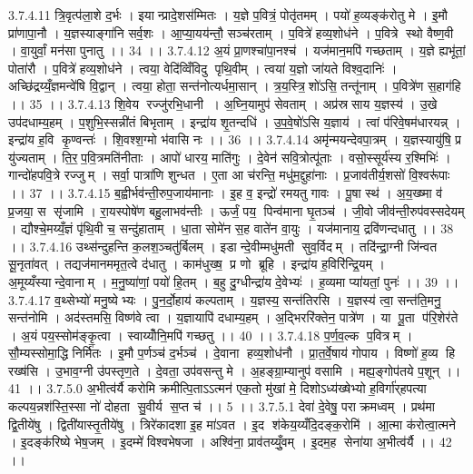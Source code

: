 3.7.4.11
त्रि॒वृत्प॑ला॒शे द॒र्भः । इयान्प्रादे॒शस॑म्मितः । य॒ज्ञे प॒वित्रं॒ पोतृ॑तमम् । पयो॑ ह॒व्यङ्क॑रोतु मे । इ॒मौ प्रा॑णापा॒नौ । य॒ज्ञस्याङ्गा॑नि सर्व॒शः । आ॒प्या॒यय॑न्तौ॒ सञ्च॑रताम् । प॒वित्रे॑ हव्य॒शोध॑ने । प॒वित्रे स्थो वैष्ण॒वी । वा॒युर्वां॒ मन॑सा पुनातु ।। 34 ।।
3.7.4.12
अ॒यं प्रा॒णश्चा॑पा॒नश्च॑ । यज॑मान॒मपि॑ गच्छताम् । य॒ज्ञे ह्यभू॑तां॒ पोता॑रौ । प॒वित्रे॑ हव्य॒शोध॑ने । त्वया॒ वेदि॑व्विँविदु पृथि॒वीम् । त्वया॑ य॒ज्ञो जा॑यते विश्व॒दानिः॑ । अच्छि॑द्रय्यँ॒ज्ञमन्वे॑षि वि॒द्वान् । त्वया॒ होता॒ सन्त॑नोत्यर्धमा॒सान् । त्र॒य॒स्त्रि॒॒शो॑ऽसि॒ तन्तू॑नाम् । प॒वित्रे॑ण स॒हाग॑हि ।। 35 ।।
3.7.4.13
शि॒वेय रज्जु॑रभि॒धानी । अ॒घ्नि॒यामुप॑ सेवताम् । अप्र॑स्रसाय य॒ज्ञस्य॑ । उ॒खे उप॑दधाम्य॒हम् । प॒शुभि॒स्सन्नी॑तं बिभृताम् । इन्द्रा॑य शृ॒तन्दधि॑ । उ॒प॒वे॒षो॑ऽसि य॒ज्ञाय॑ । त्वां प॑रिवे॒षम॑धारयन्न् । इन्द्रा॑य ह॒वि कृ॒ण्वन्तः॑ । शि॒वश्श॒ग्मो भ॑वासि नः ।। 36 ।।
3.7.4.14
अमृ॑न्मयन्देवपा॒त्रम् । य॒ज्ञस्यायु॑षि॒ प्र यु॑ज्यताम् । ति॒र॒प॒वि॒त्रमति॑नीताः । आपो॑ धारय॒ माति॑गुः । दे॒वेन॑ सवि॒त्रोत्पू॑ताः । वसो॒स्सूर्य॑स्य र॒श्मिभिः॑ । गान्दो॑हपवि॒त्रे रज्जुम् । सर्वा॒ पात्रा॑णि शुन्धत । ए॒ता आ च॑रन्ति॒ मधु॑म॒द्दुहा॑नाः । प्र॒जाव॑तीर्य॒शसो॑ वि॒श्वरू॑पाः ।। 37 ।।
3.7.4.15
ब॒ह्वीर्भव॑न्ती॒रुप॒जाय॑मानाः । इ॒ह व॒ इन्द्रो॑ रमयतु गावः । पू॒षा स्थ॑ । अ॒य॒ख्ष्मा व॑ प्र॒जया॒ स सृ॑जामि । रा॒यस्पोषे॑ण बहु॒लाभव॑न्तीः । ऊर्जं॒ पय॒ पिन्व॑माना घृ॒तञ्च॑ । जी॒वो जीव॑न्ती॒रुप॑वस्सदेयम् । द्यौश्चे॒मय्यँ॒ज्ञं पृ॑थि॒वी च॒ सन्दु॑हाताम् । धा॒ता सोमे॑न स॒ह वाते॑न वा॒युः । यज॑मानाय॒ द्रवि॑णन्दधातु ।। 38 ।।
3.7.4.16
उथ्स॑न्दुहन्ति क॒लश॒ञ्चतु॑र्बिलम् । इडान्दे॒वीम्मधु॑मती सुव॒र्विदम् । तदि॑न्द्रा॒ग्नी जि॑न्वत सू॒नृता॑वत् । तद्यज॑मानममृत॒त्वे द॑धातु । काम॑धुख्ष॒ प्र णो ब्रूहि । इन्द्रा॑य ह॒विरि॑न्द्रि॒यम् । अ॒मूय्यँस्यान्दे॒वानाम् । म॒नु॒ष्या॑णां॒ पयो॑ हि॒तम् । ब॒हु दु॒ग्धीन्द्रा॑य दे॒वेभ्यः॑ । ह॒व्यमा प्या॑यतां॒ पुनः॑ ।। 39 ।।
3.7.4.17
व॒थ्सेभ्यो॑ मनु॒ष्येभ्यः । पु॒न॒र्दो॒हाय॑ कल्पताम् । य॒ज्ञस्य॒ सन्त॑तिरसि । य॒ज्ञस्य॑ त्वा॒ सन्त॑ति॒मनु॒ सन्त॑नोमि । अद॑स्तमसि॒ विष्ण॑वे त्वा । य॒ज्ञायापि॑ दधाम्य॒हम् । अ॒द्भिररि॑क्तेन॒ पात्रे॑ण । या पू॒ता प॑रि॒शेर॑ते । अ॒यं पय॒स्सोम॑ङ्कृ॒त्वा । स्वाय्योँनि॒मपि॑ गच्छतु ।। 40 ।।
3.7.4.18
प॒र्ण॒व॒ल्क प॒वित्रम् । सौ॒म्यस्सोमा॒द्धि निर्मि॑तः । इ॒मौ प॒र्णञ्च॑ द॒र्भञ्च॑ । दे॒वाना॑ हव्य॒शोध॑नौ । प्रा॒त॒र्वे॒षाय॑ गोपाय । विष्णो॑ ह॒व्य हि रख्ष॑सि । उ॒भाव॒ग्नी उ॑पस्तृण॒ते । दे॒वता॒ उप॑वसन्तु मे । अ॒हङ्ग्रा॒म्यानुप॑ वसामि । मह्य॒ङ्गोप॑तये प॒शून् ।। 41 ।।
3.7.5.0
अ॒भीत्व॑र्यै करोमि क्रमीत्पि॒ताऽऽत्मन॑ एक॒तो मु॑खां मे॒ दिशोऽध्य॑ख्षेभ्यो ह॒विर्गा॑र्‌हपत्या कल्पय॒न्नश॑स्ति॒स्सा नो॑ दोहता सु॒वीर्य॑ स॒प्त च॑ ।। 5 ।।
3.7.5.1
देवा॑ दे॒वेषु॒ पराक्रमध्वम् । प्रथ॑मा द्वि॒तीये॑षु । द्विती॑यास्तृ॒तीये॑षु । त्रिरे॑कादशा इ॒ह मा॑ऽवत । इ॒द श॑केय॒य्यँदि॒दङ्क॒रोमि॑ । आ॒त्मा क॑रोत्वा॒त्मने । इ॒दङ्क॑रिष्ये भेष॒जम् । इ॒दम्मे॑ विश्वभेषजा । अश्वि॑ना॒ प्राव॑तय्युँ॒वम् । इ॒दम॒ह सेना॑या अ॒भीत्व॑र्यै ।। 42 ।।
